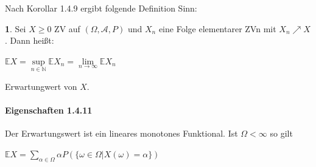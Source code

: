 \documentclass[10pt,a4paper]{report}
\numberwithin{equation}{section}
\numberwithin{figure}{section}
\theoremstyle{plain}
\theoremstyle{definition}
\newtheorem{defn}[thm]{\protect\definitionname}
\theoremstyle{remark}
\theoremstyle{plain}
\providecommand{\definitionname}{Definition}
\newcommand{\1}{ \mathbb{1} } %
\begin{document}
Nach Korollar 1.4.9 ergibt folgende Definition Sinn:
\begin{defn} 
  Sei $X\geq 0$ ZV auf $(\Omega,\mathcal{A},P)$ und $X_n$ eine Folge
  elementarer ZVn mit $X_n\nearrow X$. Dann heißt:
  \begin{center}
    $\mathbb{E}X=\sup\limits_{n\in
      \mathbb{N}}\mathbb{E}X_n=\lim\limits_{n \to
      \infty}\mathbb{E}X_n$
  \end{center}
  Erwartungwert von $X$.
\end{defn}
\paragraph{Eigenschaften 1.4.11}
Der Erwartungswert ist ein lineares monotones Funktional. Ist $\Omega<\infty$ so gilt
\begin{center}
$\mathbb{E}X=\sum\limits_{\alpha \in \Omega}\alpha P(\{\omega \in \Omega|X(\omega)=\alpha\})$
\end{center}
\end{document}

